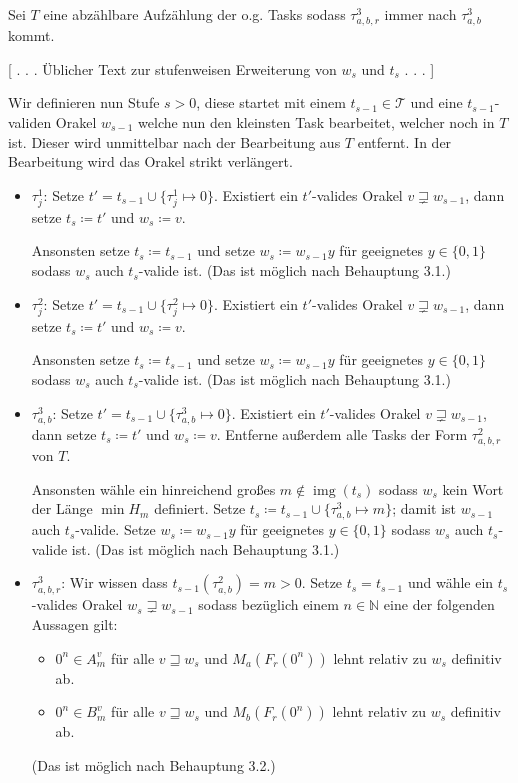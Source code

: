 \documentclass[nofonts]{uebung}
\theoremstyle{definition}
\DeclareMathOperator{\img}{img}
\begin{document}
Sei $T$ eine abzählbare Aufzählung der o.g. Tasks sodass $\tau^3_{a,b,r}$ immer nach $\tau^3_{a,b}$ kommt.

[ . . . Üblicher Text zur stufenweisen Erweiterung von $w_s$ und $t_s$ . . . ]

Wir definieren nun Stufe $s>0$, diese startet mit einem $t_{s-1}\in\mathcal T$ und eine $t_{s-1}$-validen Orakel $w_{s-1}$ welche nun den kleinsten Task bearbeitet, welcher noch in $T$ ist. Dieser wird unmittelbar nach der Bearbeitung aus $T$ entfernt. In der Bearbeitung wird das Orakel strikt verlängert.
\begin{itemize}

    \item $\tau^1_j$: Setze $t'=t_{s-1}\cup\{\tau^1_j\mapsto 0\}$. Existiert ein $t'$-valides Orakel $v\sqsupsetneq w_{s-1}$, dann setze $t_s\coloneqq t'$ und $w_s\coloneqq v$.

        Ansonsten setze $t_s\coloneqq t_{s-1}$ und setze $w_s\coloneqq w_{s-1}y$ für geeignetes $y\in\{0,1\}$ sodass $w_s$ auch $t_s$-valide ist. (Das ist möglich nach Behauptung 3.1.)

    \item $\tau^2_j$: Setze $t'=t_{s-1}\cup\{\tau^2_j\mapsto 0\}$. Existiert ein $t'$-valides Orakel $v\sqsupsetneq w_{s-1}$, dann setze $t_s\coloneqq t'$ und $w_s\coloneqq v$.

        Ansonsten setze $t_s\coloneqq t_{s-1}$ und setze $w_s\coloneqq w_{s-1}y$ für geeignetes $y\in\{0,1\}$ sodass $w_s$ auch $t_s$-valide ist. (Das ist möglich nach Behauptung 3.1.)

    \item $\tau^3_{a,b}$: Setze $t'=t_{s-1}\cup\{\tau^3_{a,b}\mapsto 0\}$. Existiert ein $t'$-valides Orakel $v\sqsupsetneq w_{s-1}$, dann setze $t_s\coloneqq t'$ und $w_s\coloneqq v$. Entferne außerdem alle Tasks der Form $\tau^2_{a,b,r}$ von $T$.

        Ansonsten wähle ein hinreichend großes $m\not\in \img(t_s)$ sodass $w_s$ kein Wort der Länge $\min H_m$ definiert. Setze $t_s\coloneqq t_{s-1}\cup \{ \tau^3_{a,b}\mapsto m \}$; damit ist $w_{s-1}$ auch $t_s$-valide. Setze $w_s\coloneqq w_{s-1}y$ für geeignetes $y\in\{0,1\}$ sodass $w_s$ auch $t_s$-valide ist. (Das ist möglich nach Behauptung 3.1.)

    \item $\tau^3_{a,b,r}$: Wir wissen dass $t_{s-1}(\tau^2_{a,b})=m>0$. Setze $t_s=t_{s-1}$ und wähle ein $t_s$-valides Orakel $w_s\sqsupsetneq w_{s-1}$ sodass bezüglich einem $n\in\mathbb N$ eine der folgenden Aussagen gilt:
        \begin{itemize}[nosep,endpenalty=10000]
            \item $0^n\in A_m^v$ für alle $v\sqsupseteq w_s$ und $M_a(F_r(0^n))$ lehnt relativ zu $w_s$ definitiv ab.
            \item $0^n\in B_m^v$ für alle $v\sqsupseteq w_s$ und $M_b(F_r(0^n))$ lehnt relativ zu $w_s$ definitiv ab.
        \end{itemize} (Das ist möglich nach Behauptung 3.2.)
\end{itemize}
\end{document}
